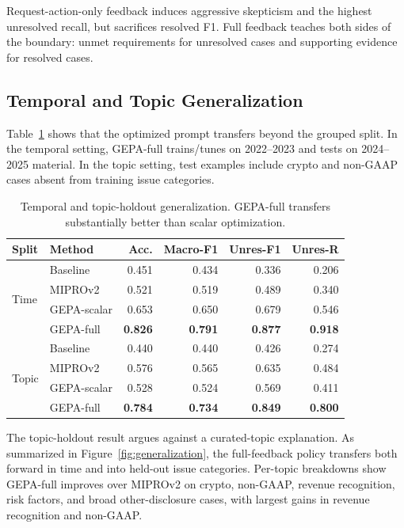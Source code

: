 \documentclass[11pt]{article}
\begin{document}
Request-action-only feedback induces aggressive skepticism and the highest unresolved recall, but sacrifices resolved F1. Full feedback teaches both sides of the boundary: unmet requirements for unresolved cases and supporting evidence for resolved cases.

\subsection{Temporal and Topic Generalization}

Table~\ref{tab:gen} shows that the optimized prompt transfers beyond the grouped split. In the temporal setting, GEPA-full trains/tunes on 2022--2023 and tests on 2024--2025 material. In the topic setting, test examples include crypto and non-GAAP cases absent from training issue categories.

\begin{table}[t]
\centering
\small
\begin{tabular}{llrrrr}
\toprule
\textbf{Split} & \textbf{Method} & \textbf{Acc.} & \textbf{Macro-F1} & \textbf{Unres-F1} & \textbf{Unres-R} \\
\midrule
\multirow{4}{*}{Time} 
& Baseline & 0.451 & 0.434 & 0.336 & 0.206 \\
& MIPROv2 & 0.521 & 0.519 & 0.489 & 0.340 \\
& GEPA-scalar & 0.653 & 0.650 & 0.679 & 0.546 \\
& GEPA-full & \textbf{0.826} & \textbf{0.791} & \textbf{0.877} & \textbf{0.918} \\
\midrule
\multirow{4}{*}{Topic}
& Baseline & 0.440 & 0.440 & 0.426 & 0.274 \\
& MIPROv2 & 0.576 & 0.565 & 0.635 & 0.484 \\
& GEPA-scalar & 0.528 & 0.524 & 0.569 & 0.411 \\
& GEPA-full & \textbf{0.784} & \textbf{0.734} & \textbf{0.849} & \textbf{0.800} \\
\bottomrule
\end{tabular}
\caption{Temporal and topic-holdout generalization. GEPA-full transfers substantially better than scalar optimization.}
\label{tab:gen}
\end{table}

The topic-holdout result argues against a curated-topic explanation. As summarized in Figure~\ref{fig:generalization}, the full-feedback policy transfers both forward in time and into held-out issue categories. Per-topic breakdowns show GEPA-full improves over MIPROv2 on crypto, non-GAAP, revenue recognition, risk factors, and broad other-disclosure cases, with largest gains in revenue recognition and non-GAAP.
\end{document}
